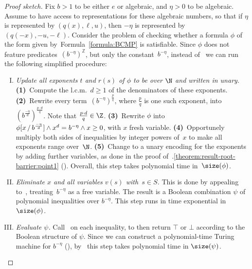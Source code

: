 \begin{proof}[Proof sketch]
Fix $b > 1$ to be either $e$ or algebraic, 
and $\eta > 0$ to be algebraic. 
Assume to have access to representations for these algebraic numbers, 
so that if $\eta$ is represented by $(q(x),\ell,u)$, then $-\eta$ is represented by $(q(-x),-u,-\ell)$.
Consider the problem of checking whether a formula $\phi$ of the form given by~Formula~\ref{formula:BCMP} is satisfiable. 
Since $\phi$ does not feature predicates~$(b^{-\eta})^{\mathbb{Z}}$, but only the constant~$b^{-\eta}$, 
instead of~ we can run the following simplified procedure:%
\begin{enumerate}[I.]
    \item \emph{Update all exponents $t$ and $r(s)$ of $\phi$ to be over $\N$
    and written in unary.} \textbf{(1)}~Compute the l.c.m.~$d \geq 1$ of the
    denominators of these exponents. \textbf{(2)}~Rewrite every
    term~$(b^{-\eta})^{\frac{p}{q}}$, where $\frac{p}{q}$ is one such
    exponent, into $(b^{\frac{-\eta}{d}})^{\frac{p \cdot d}{q}}$. Note that
    $\frac{p \cdot d}{q} \in \Z$. \textbf{(3)}~Rewrite $\phi$ into
    $\phi[x\,/\,b^{\frac{-\eta}{d}}] \land  x^d = b^{-\eta} \land x \geq
    0$, with $x$ fresh variable. \textbf{(4)}~Opportunely multiply both sides of
    inequalities by integer powers of~$x$ to make all exponents range over~$\N$.
    \textbf{(5)}~Change to a unary encoding for the exponents by adding further
    variables, as done in the proof
    of~.\ref{theorem:result-root-barrier:point1}
    (). Overall, this step takes polynomial time
    in~$\size(\phi)$.
    \item \emph{Eliminate $x$ and all variables $v(s)$ with~$s \in S$.} This is
    done by appealing to~, treating~$b^{-\eta}$ as a free
    variable. The result is a Boolean combination $\psi$ of polynomial
    inequalities over $b^{-\eta}$. This step runs in time exponential in
    $\size(\phi)$.
    \item \emph{Evaluate $\psi$.} Call~ on each
    inequality, to then return $\top$ or $\bot$ according to the Boolean
    structure of $\psi$. Since we can construct a polynomial-time Turing machine
    for $b^{-\eta}$ (),
    by~ this step takes polynomial
    time in $\size(\psi)$. 
    \qedhere
\end{enumerate}
\end{proof}